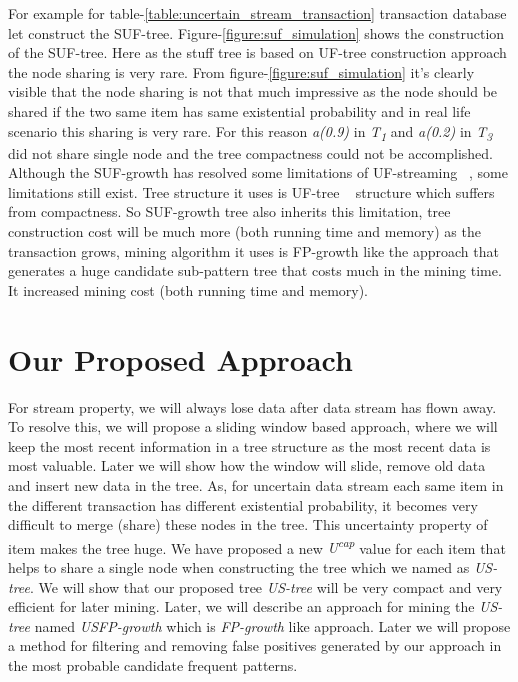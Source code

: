 \documentclass[conference]{IEEEtran}
\begin{document}
    For example for table-\ref{table:uncertain_stream_transaction} transaction database let construct the SUF-tree. Figure-\ref{figure:suf_simulation} shows the construction of the SUF-tree. Here as the stuff tree is based on UF-tree construction approach the node sharing is very rare. From figure-\ref{figure:suf_simulation} it’s clearly visible that the node sharing is not that much impressive as the node should be shared if the two same item has same existential probability and in real life scenario this sharing is very rare. For this reason \emph{a(0.9)} in \emph{T\textsubscript{1}} and \emph{a(0.2)} in \emph{T\textsubscript{3}} did not share single node and the tree compactness could not be accomplished. Although the SUF-growth has resolved some limitations of UF-streaming ~\cite{suf_growth}, some limitations still exist. Tree structure it uses is UF-tree ~\cite{uf_growth} structure which suffers from compactness. So SUF-growth tree also inherits this limitation, tree construction cost will be much more (both running time and memory) as the transaction grows, mining algorithm it uses is FP-growth like the approach that generates a huge candidate sub-pattern tree that costs much in the mining time. It increased mining cost (both running time and memory).
    
\section{Our Proposed Approach}
For stream property, we will always lose data after data stream has flown away. To resolve this, we will propose a sliding window based approach, where we will keep the most recent information in a tree structure as the most recent data is most valuable. Later we will show how the window will slide, remove old data and insert new data in the tree. As, for uncertain data stream each same item in the different transaction has different existential probability, it becomes very difficult to merge (share) these nodes in the tree. This uncertainty property of item makes the tree huge. We have proposed a new \emph{U\textsuperscript{cap}} value for each item that helps to share a single node when constructing the tree which we named as \emph{US-tree}. We will show that our proposed tree \emph{US-tree} will be very compact and very efficient for later mining. Later, we will describe an approach for mining the \emph {US-tree} named \emph{USFP-growth} which is \emph{FP-growth} like approach. Later we will propose a method for filtering and removing false positives generated by our approach in the most probable candidate frequent patterns.
\end{document}
